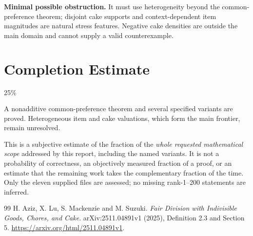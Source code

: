 \documentclass[11pt,a4paper]{article}
\theoremstyle{remark}\newtheorem{remark}[theorem]{Remark}
\begin{document}
\textbf{Minimal possible obstruction.} It must use heterogeneity beyond the common-preference theorem; disjoint cake supports and context-dependent item magnitudes are natural stress features. Negative cake densities are outside the main domain and cannot supply a valid counterexample.

\section{Completion Estimate}
25\%

A nonadditive common-preference theorem and several specified variants are proved. Heterogeneous item and cake valuations, which form the main frontier, remain unresolved.

This is a subjective estimate of the fraction of the \emph{whole requested mathematical scope} addressed by this report, including the named variants. It is not a probability of correctness, an objectively measured fraction of a proof, or an estimate that the remaining work takes the complementary fraction of the time. Only the eleven supplied files are assessed; no missing rank-1--200 statements are inferred.

\begin{thebibliography}{99}
 H. Aziz, X. Lu, S. Mackenzie and M. Suzuki. \emph{Fair Division with Indivisible Goods, Chores, and Cake}. arXiv:2511.04891v1 (2025), Definition 2.3 and Section 5. \url{https://arxiv.org/html/2511.04891v1}.
\end{thebibliography}
\end{document}
